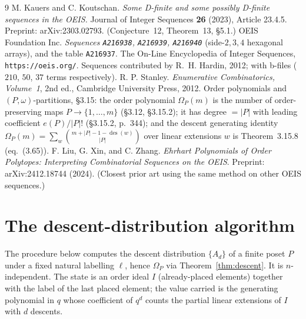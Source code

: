 \documentclass[11pt]{article}
\theoremstyle{plain}
\theoremstyle{definition}
\theoremstyle{remark}
\newcommand{\OEIS}[1]{\texttt{#1}}
\newcommand{\Om}{\Omega}
\newcommand{\des}{\operatorname{des}}
\begin{document}
\begin{thebibliography}{9}
 M. Kauers and C. Koutschan.
\emph{Some D-finite and some possibly D-finite sequences in the OEIS.}
Journal of Integer Sequences \textbf{26} (2023), Article 23.4.5.
Preprint: arXiv:2303.02793. (Conjecture~12, Theorem~13, \S5.1.)
 OEIS Foundation Inc.
\emph{Sequences \OEIS{A216938}, \OEIS{A216939}, \OEIS{A216940}} (side-$2,3,4$ hexagonal arrays), and
the table \OEIS{A216937}. The On-Line Encyclopedia of Integer Sequences,
\texttt{https://oeis.org/}. Sequences contributed by R.~H. Hardin, 2012; with b-files
($210$, $50$, $37$ terms respectively).
 R. P. Stanley.
\emph{Enumerative Combinatorics, Volume~1}, 2nd ed., Cambridge University Press, 2012.
Order polynomials and $(P,\omega)$-partitions, \S3.15: the order polynomial $\Om_P(m)$ is the number
of order-preserving maps $P\to\{1,\dots,m\}$ (\S3.12, \S3.15.2); it has degree $=\lvert P\rvert$ with
leading coefficient $e(P)/\lvert P\rvert!$ (\S3.15.2, p.~344); and the descent generating identity
$\Om_P(m)=\sum_{w}\binom{m+\lvert P\rvert-1-\des(w)}{\lvert P\rvert}$ over linear extensions $w$ is
Theorem~3.15.8 (eq.~(3.65)).
 F. Liu, G. Xin, and C. Zhang.
\emph{Ehrhart Polynomials of Order Polytopes: Interpreting Combinatorial Sequences on the OEIS}.
Preprint: arXiv:2412.18744 (2024). (Closest prior art using the same method on other OEIS
sequences.)
\end{thebibliography}

\appendix

\section{The descent-distribution algorithm}\label{app:alg}

The procedure below computes the descent distribution $\{A_d\}$ of a finite poset $P$ under a fixed
natural labelling $\ell$, hence $\Om_P$ via Theorem~\ref{thm:descent}. It is $n$-independent. The
state is an order ideal $I$ (already-placed elements) together with the label of the last placed
element; the value carried is the generating polynomial in $q$ whose coefficient of $q^d$ counts the
partial linear extensions of $I$ with $d$ descents.
\end{document}

